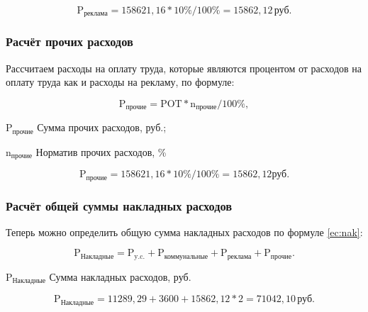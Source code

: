 \begin{equation*}
    \text{P}_\text{реклама} = 158621,16 * 10\% / 100\% = 15862,12 \, \text{руб}.
\end{equation*}

\subsubsection{Расчёт прочих расходов}

Рассчитаем расходы на оплату труда, которые являются процентом от расходов
на оплату труда как и расходы на рекламу, по формуле:

\begin{equation}
    \text{P}_\text{прочие} = \text{POT} * \text{n}_\text{прочие} / 100\%,
\end{equation}

\begin{eqexpl}[6ex]
    \item{$\text{P}_\text{прочие}$} Сумма прочих расходов, руб.;
    \item{$\text{n}_\text{прочие}$} Норматив прочих расходов, \%
\end{eqexpl}

\begin{equation*}
    \text{P}_\text{прочие} =  158621,16 * 10\% / 100\% = 15862,12 \text{руб}.
\end{equation*}

\subsubsection{Расчёт общей суммы накладных расходов}

Теперь можно определить общую сумма накладных расходов по формуле \ref{ec:nak}:

\begin{equation}
    \label{ec:nak}
    \text{P}_\text{Накладные} = \text{P}_\text{y.c.} + \text{P}_\text{коммунальные} + \text{P}_\text{реклама} + \text{P}_\text{прочие}.
\end{equation}

\begin{eqexpl}[9ex]
    \item{$\text{P}_\text{Накладные}$} Сумма накладных расходов, руб.
\end{eqexpl}

\begin{equation*}
    \text{P}_\text{Накладные} = 11289,29 + 3600 + 15862,12 * 2 = 71042,10 \, \text{руб.}
\end{equation*}

